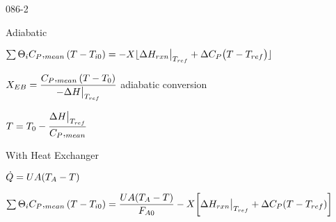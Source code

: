 \begin{mitframe}{086-2}

        
\begin{listone}

	\item Adiabatic
	\item $\sum\nolimits\dimltemp_{\state}\cp,_{mean}(\Temp-\Temp_{\state\init})=-X\lfloor\iipf\enthalpy_{rxn}\big|_{\Temp_{ref}}+\iipf\cp\big(\Temp-\Temp_{ref}\big)\rfloor$
        \begin{listtwo}
			\item $X_{\energy\exergy}=\dfrac{\cp,_{mean}(\Temp-\Temp_0)}{-\iipf\enthalpy\big|_{\Temp_{ref}}}$ adiabatic conversion
		    \item $\Temp=\Temp_{\init}-\dfrac{\iipf\enthalpy\big|_{\Temp_{ref}}}{\cp,_{mean}}$
        \end{listtwo}

	\item With Heat Exchanger
	\item $\dot{\heatflow}=\uvel\helmholtz(\Temp_{\helmholtz}-\Temp)$
	\item $\sum\nolimits\dimltemp_{\state}\cp,_{mean}(\Temp-\Temp_{\state\init})=\dfrac{\uvel\helmholtz(\Temp_{\helmholtz}-\Temp)}{\force_{\helmholtz{0}}}-X\bigg[\iipf\enthalpy_{rxn}\big|_{\Temp_{ref}}+\iipf\cp(\Temp-\Temp_{ref})\bigg]$

\end{listone}        

\end{mitframe}